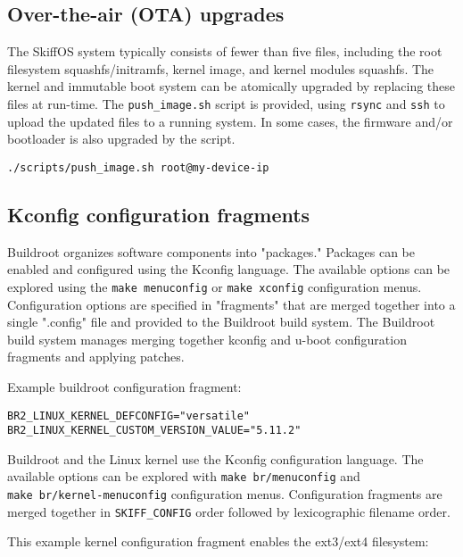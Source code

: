 \documentclass[english,]{IEEEtran}
\begin{document}
\hypertarget{over-the-air-ota-upgrades}{%
\subsection{Over-the-air (OTA)
upgrades}\label{over-the-air-ota-upgrades}}

The SkiffOS system typically consists of fewer than five files,
including the root filesystem squashfs/initramfs, kernel image, and
kernel modules squashfs. The kernel and immutable boot system can be
atomically upgraded by replacing these files at run-time. The
\texttt{push\_image.sh} script is provided, using \texttt{rsync} and
\texttt{ssh} to upload the updated files to a running system. In some
cases, the firmware and/or bootloader is also upgraded by the script.

\texttt{./scripts/push\_image.sh\ root@my-device-ip}

\hypertarget{kconfig-configuration-fragments}{%
\subsection{Kconfig configuration
fragments}\label{kconfig-configuration-fragments}}

Buildroot organizes software components into "packages." Packages can be
enabled and configured using the Kconfig language. The available options
can be explored using the \texttt{make\ menuconfig} or
\texttt{make\ xconfig} configuration menus. Configuration options are
specified in "fragments" that are merged together into a single
".config" file and provided to the Buildroot build system. The Buildroot
build system manages merging together kconfig and u-boot configuration
fragments and applying patches.

Example buildroot configuration fragment:

\begin{verbatim}
BR2_LINUX_KERNEL_DEFCONFIG="versatile"
BR2_LINUX_KERNEL_CUSTOM_VERSION_VALUE="5.11.2"
\end{verbatim}

Buildroot and the Linux kernel use the Kconfig configuration language.
The available options can be explored with \texttt{make\ br/menuconfig}
and \texttt{make\ br/kernel-menuconfig} configuration menus.
Configuration fragments are merged together in \texttt{SKIFF\_CONFIG}
order followed by lexicographic filename order.

This example kernel configuration fragment enables the ext3/ext4
filesystem:
\end{document}
